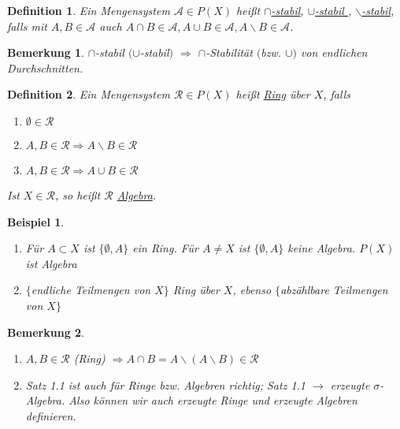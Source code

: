 \documentclass[11pt]{memoir}
\theoremstyle{break}
\newtheorem{Definition}{Definition}[chapter]
\newtheorem{Bemerkung}{Bemerkung}[chapter]
\newtheorem{Beispiel}{Beispiel}[chapter]
\begin{document}
\begin{Definition}
Ein Mengensystem $\mathscr A \in P(X)$ heißt \underline{$\cap$-stabil}, \underline{ $\cup$-stabil }, \underline{$\backslash$-stabil}, falls mit $A, B \in \mathscr A$ auch $A \cap B \in \mathscr A, A \cup B \in \mathscr A, A\backslash B \in \mathscr A$.
\end{Definition}

\begin{Bemerkung}
$\cap$-stabil $(\cup$-stabil$)$ $\Rightarrow$ $\cap$-Stabilität $($bzw. $\cup)$ von endlichen Durchschnitten.
\end{Bemerkung}

\begin{Definition}
Ein Mengensystem $\mathscr R \in P(X)$ heißt \underline{Ring} über $X$, falls
\begin{enumerate}
	\item $\emptyset \in \mathscr R$
	\item $A, B \in \mathscr R \Rightarrow A\backslash B \in \mathscr R$
	\item $A, B \in \mathscr R \Rightarrow A \cup B \in \mathscr R$
\end{enumerate}
Ist $X \in \mathscr R$, so heißt $\mathscr R$ \underline{Algebra}.
\end{Definition}


\begin{Beispiel}
\begin{enumerate}
	\item Für $A \subset X$ ist $\{\emptyset, A\}$ ein Ring. Für $A \ne X$ ist $\{\emptyset, A\}$ keine Algebra. $P(X)$ ist Algebra
	\item $\{$endliche Teilmengen von $X\}$ Ring über $X$, ebenso $\{ $abzählbare Teilmengen von $X\}$
\end{enumerate}
\end{Beispiel}

\begin{Bemerkung}
\begin{enumerate}
	\item $A, B \in \mathscr R$ (Ring) $\Rightarrow A \cap B = A \backslash (A \backslash B) \in \mathscr R$
	 \item Satz 1.1 ist auch für Ringe bzw. Algebren richtig; Satz 1.1 $\rightarrow$ erzeugte $\sigma$-Algebra. Also können wir auch erzeugte Ringe und erzeugte Algebren definieren.
\end{enumerate}
\end{Bemerkung}
\end{document}
